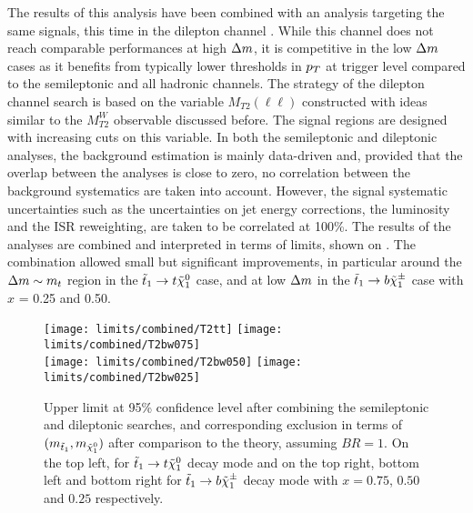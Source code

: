     The results of this analysis have been combined with an analysis targeting
    the same signals, this time in the dilepton channel \cite{stopDilepton}.
    While this channel does not reach comparable performances at high $\Delta m$,
    it is competitive in the low $\Delta m$ cases as it benefits from typically
    lower thresholds in $p_T$ at trigger level compared to the semileptonic and
    all hadronic channels. The strategy of the dilepton channel search is based
    on the variable $M_{T2}(\ell\ell)$ constructed with ideas similar to the
    $M_{T2}^W$ observable discussed before. The signal regions are designed with
    increasing cuts on this variable. In both the semileptonic and dileptonic
    analyses, the background estimation is mainly data-driven and, provided that
    the overlap between the analyses is close to zero, no correlation between
    the background systematics are taken into account. However, the signal
    systematic uncertainties such as the uncertainties on jet energy
    corrections, the luminosity and the ISR reweighting, are taken to be
    correlated at 100\%. The results of the analyses are combined and
    interpreted in terms of limits, shown on . The
    combination allowed small but significant improvements, in particular around
    the $\Delta m \sim m_{t}$ region in the $\tilde{t}_1 \rightarrow t
    \tilde{\chi}_1^0$ case, and at low $\Delta m$ in the $\tilde{t}_1 \rightarrow b
    \tilde{\chi}_1^\pm$ case with $x$ = 0.25 and 0.50.

    \begin{figure}[h!]
        \centering
        \texttt{[image: limits/combined/T2tt]}
        \texttt{[image: limits/combined/T2bw075]}\\
        \texttt{[image: limits/combined/T2bw050]}
        \texttt{[image: limits/combined/T2bw025]}\\
        \caption{Upper limit at 95\% confidence level after combining the
        semileptonic and dileptonic searches, and corresponding exclusion in
        terms of $(m_{\tilde{t}_1}, m_{\tilde{\chi}_1^0})$ after comparison to the
        theory, assuming $BR = 1$. On the top left, for $\tilde{t}_1 \rightarrow t
        \tilde{\chi}_1^0$ decay mode and on the top right, bottom left and bottom
        right for $\tilde{t}_1 \rightarrow b \tilde{\chi}_1^\pm$ decay mode with $x=0.75$,
        $0.50$ and $0.25$ respectively.}
        \label{fig:resultsCombined}
    \end{figure}

